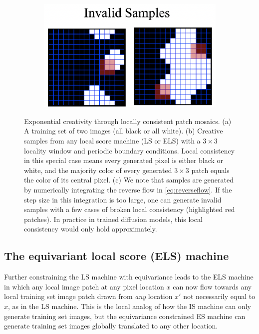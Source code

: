 \documentclass{article}
\theoremstyle{plain}
\theoremstyle{definition}
\theoremstyle{remark}
\begin{document}
\begin{figure}[t]
\begin{subfigure}[b]{0.2\linewidth}
    \includegraphics[width=\linewidth,valign=b]{wf3.png}
    \caption{}
    \label{fig:exceptional_pointsc}
    \end{subfigure}

        
    \vspace{-1em}
    \caption{Exponential creativity through locally consistent patch mosaics. (a) A training set of two images (all black or all white). (b) Creative samples from any local score machine (LS or ELS) with a $3\times3$ locality window and periodic boundary conditions. Local consistency in this special case means every generated pixel is either black or white, and the majority color of every generated $3\times3$ patch equals the color of its central pixel. (c) We note that samples are generated by numerically integrating the reverse flow in \eqref{eq:reverseflow}. If the step size in this integration is too large, one can generate invalid samples with a few cases of broken local consistency (highlighted red patches). In practice in trained diffusion models, this local consistency would only hold approximately.}
    \label{fig:exceptional_points} %
\end{figure}
\subsection{The equivariant local score (ELS) machine}

Further constraining the LS machine with equivariance leads to the ELS machine in which any local image patch at any pixel location $x$ can now flow towards any local training set image patch drawn from {\it any} location $x'$ not necessarily equal to $x$, as in the LS machine. This is the local analog of how the IS machine can only generate training set images, but the equivariance constrained ES machine can generate training set images globally translated to any other location.  
\end{document}
